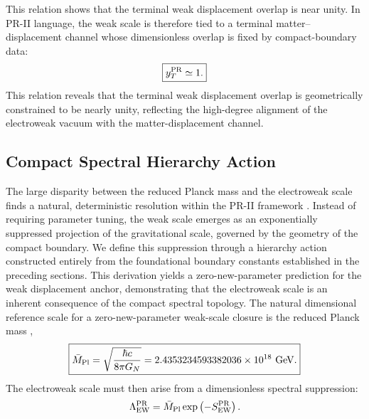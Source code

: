 \documentclass[11pt]{article}
\begin{document}
This relation shows that the terminal weak displacement overlap is near unity. 
In PR-II language, the weak scale is therefore tied to a terminal matter--displacement channel whose dimensionless overlap is fixed by compact-boundary data:
\begin{equation}
\boxed{
y_T^{\rm PR}\simeq1.
}
\end{equation}
This relation reveals that the terminal weak displacement overlap is geometrically constrained to be nearly unity, reflecting the high-degree alignment of the electroweak vacuum with the matter-displacement channel.

\subsection{Compact Spectral Hierarchy Action}
\label{sec:pr2_compact_spectral_hierarchy_action}
The large disparity between the reduced Planck mass and the electroweak scale finds a natural, deterministic resolution within the PR-II framework \cite{Susskind1979}. Instead of requiring parameter tuning, the weak scale emerges as an exponentially suppressed projection of the gravitational scale, governed by the geometry of the compact boundary. We define this suppression through a hierarchy action constructed entirely from the foundational boundary constants established in the preceding sections. This derivation yields a zero-new-parameter prediction for the weak displacement anchor, demonstrating that the electroweak scale is an inherent consequence of the compact spectral topology.
The natural dimensional reference scale for a zero-new-parameter weak-scale closure is the reduced Planck mass \cite{TiesingaCODATA2021},
\begin{equation}
\boxed{
\bar M_{\rm Pl}
=
\sqrt{
\frac{\hbar c}{8\pi G_N}
}
=
2.4353234593382036\times10^{18}\ {\rm GeV}.
}
\end{equation}
The electroweak scale must then arise from a dimensionless spectral suppression:
\begin{equation}
\Lambda_{\rm EW}^{\rm PR}
=
\bar M_{\rm Pl}
\exp
\left(
-S_{\rm EW}^{\rm PR}
\right).
\end{equation}
\end{document}
